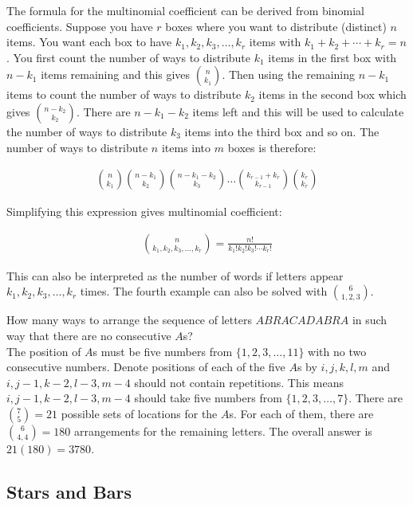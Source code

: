 The formula for the multinomial coefficient can be derived from binomial coefficients. Suppose you have $r$ boxes where you want to distribute (distinct) $n$ items. You want each box to have $k_1, k_2, k_3, \dots, k_r$ items with $k_1+k_2+\cdots + k_r=n$. You first count the number of ways to distribute $k_1$ items in the first box with $n-k_1$ items remaining and this gives $\binom{n}{k_1}$. Then using the remaining $n-k_1$ items to count the number of ways to distribute $k_2$ items in the second box which gives $\binom{n-k_2}{k_2}$. There are $n-k_1-k_2$ items left and this will be used to calculate the number of ways to distribute $k_3$ items into the third box and so on. The number of ways to distribute $n$ items into $m$ boxes is therefore:

\begin{align*}
	\binom{n}{k_1}\binom{n-k_1}{k_2}\binom{n-k_1-k_2}{k_3}\ldots\binom{k_{r-1}+k_r}{k_{r-1}}\binom{k_r}{k_r}
\end{align*}

Simplifying this expression gives multinomial coefficient:

\begin{align*}
	\boxed{\binom{n}{k_1, k_2, k_3, \dots, k_r} = \frac{n!}{k_1! k_2! k_3! \cdots k_r!}}
\end{align*}

This can also be interpreted as the number of words if letters appear $k_1, k_2, k_3, \dots, k_r$ times. The fourth example can also be solved with $\binom{6}{1, 2, 3}$.

\begin{texample}
	How many ways to arrange the sequence of letters $ABRACADABRA$ in such way that there are no consecutive $A$s? \\
	
	The position of $A$s must be five numbers from $\{1, 2, 3, \dots, 11\}$ with no two consecutive numbers. Denote positions of each of the five $A$s by $i,j,k,l,m$ and $i, j-1, k-2, l-3, m-4$ should not contain repetitions. This means $i, j-1, k-2, l-3, m-4$ should take five numbers from $\{1, 2, 3, \dots, 7\}$. There are $\binom{7}{5}=21$ possible sets of locations for the $A$s. For each of them, there are $\binom{6}{4,4}=180$ arrangements for the remaining letters. The overall answer is $21(180)=3780$.
\end{texample}

\subsection{Stars and Bars}

